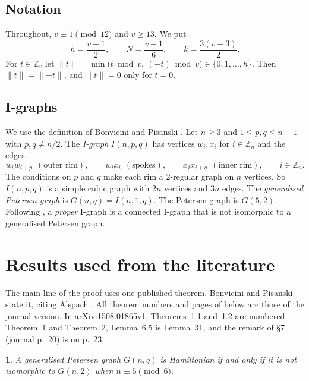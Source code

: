\documentclass[11pt]{amsart}
\theoremstyle{plain}
\newcommand{\citedname}{}
\newtheorem*{citedinner}{\citedname}
\newenvironment{cited}[1]{\renewcommand{\citedname}{#1}\begin{citedinner}}{\end{citedinner}}
\theoremstyle{definition}
\theoremstyle{remark}
\numberwithin{equation}{section}
\newcommand{\Z}{\mathbb{Z}}
\newcommand{\nrm}[1]{\lVert #1\rVert}
\begin{document}
\subsection{Notation}
Throughout, \(v\equiv1\pmod{12}\) and \(v\ge 13\). We put
\begin{equation}\label{eq:hNk}
h=\frac{v-1}{2},\qquad N=\frac{v-1}{6},\qquad k=\frac{3(v-3)}{2}.
\end{equation}
For \(t\in\Z_v\) let \(\nrm{t}=\min\bigl(t \bmod v,\ (-t)\bmod v\bigr)\in\{0,1,\dots,h\}\). Then \(\nrm{t}=\nrm{-t}\), and \(\nrm{t}=0\) only for \(t=0\).

\subsection{I-graphs}
We use the definition of Bonvicini and Pisanski \cite[\S1]{BP}. Let \(n\ge3\) and \(1\le p,q\le n-1\) with \(p,q\ne n/2\). The \emph{I-graph} \(I(n,p,q)\) has vertices \(w_i,x_i\) for \(i\in\Z_n\) and the edges
\[
w_iw_{i+p}\ \ (\text{outer rim}),\qquad w_ix_i\ \ (\text{spokes}),\qquad x_ix_{i+q}\ \ (\text{inner rim}),\qquad i\in\Z_n .
\]
The conditions on \(p\) and \(q\) make each rim a \(2\)-regular graph on \(n\) vertices. So \(I(n,p,q)\) is a simple cubic graph with \(2n\) vertices and \(3n\) edges. The \emph{generalised Petersen graph} is \(G(n,q)=I(n,1,q)\). The Petersen graph is \(G(5,2)\). Following \cite{BP}, a \emph{proper} I-graph is a connected I-graph that is not isomorphic to a generalised Petersen graph.

\section{Results used from the literature}\label{sec:lit}

The main line of the proof uses one published theorem. Bonvicini and Pisanski state it, citing Alspach \cite{Als}. All theorem numbers and pages of \cite{BP} below are those of the journal version. In arXiv:1508.01865v1, Theorems~1.1 and~1.2 are numbered Theorem~1 and Theorem~2, Lemma~6.5 is Lemma~31, and the remark of \S7 (journal p.~20) is on p.~23.

\begin{cited}{Theorem BP1 (Alspach; \cite[Theorem~1.1]{BP})}
A generalised Petersen graph \(G(n,q)\) is Hamiltonian if and only if it is not isomorphic to \(G(n,2)\) when \(n\equiv 5\pmod 6\).
\end{cited}
\end{document}

